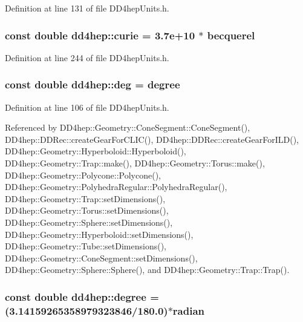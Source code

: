 Definition at line 131 of file DD4hepUnits.h.\hypertarget{namespacedd4hep_a024c7af7439282d20567717fbdae08bb}{
\subsubsection[{curie}]{\setlength{\rightskip}{0pt plus 5cm}const double {\bf dd4hep::curie} = 3.7e+10 $\ast$ becquerel}}
\label{namespacedd4hep_a024c7af7439282d20567717fbdae08bb}


Definition at line 244 of file DD4hepUnits.h.\hypertarget{namespacedd4hep_a0601e2b88f6f0cccb407192156174957}{
\subsubsection[{deg}]{\setlength{\rightskip}{0pt plus 5cm}const double {\bf dd4hep::deg} = {\bf degree}}}
\label{namespacedd4hep_a0601e2b88f6f0cccb407192156174957}


Definition at line 106 of file DD4hepUnits.h.

Referenced by DD4hep::Geometry::ConeSegment::ConeSegment(), DD4hep::DDRec::createGearForCLIC(), DD4hep::DDRec::createGearForILD(), DD4hep::Geometry::Hyperboloid::Hyperboloid(), DD4hep::Geometry::Trap::make(), DD4hep::Geometry::Torus::make(), DD4hep::Geometry::Polycone::Polycone(), DD4hep::Geometry::PolyhedraRegular::PolyhedraRegular(), DD4hep::Geometry::Trap::setDimensions(), DD4hep::Geometry::Torus::setDimensions(), DD4hep::Geometry::Sphere::setDimensions(), DD4hep::Geometry::Hyperboloid::setDimensions(), DD4hep::Geometry::Tube::setDimensions(), DD4hep::Geometry::ConeSegment::setDimensions(), DD4hep::Geometry::Sphere::Sphere(), and DD4hep::Geometry::Trap::Trap().\hypertarget{namespacedd4hep_a9fbc5184e0fbd4235e8efb28cc3ab3af}{
\subsubsection[{degree}]{\setlength{\rightskip}{0pt plus 5cm}const double {\bf dd4hep::degree} = (3.14159265358979323846/180.0)$\ast${\bf radian}}}
\label{namespacedd4hep_a9fbc5184e0fbd4235e8efb28cc3ab3af}


